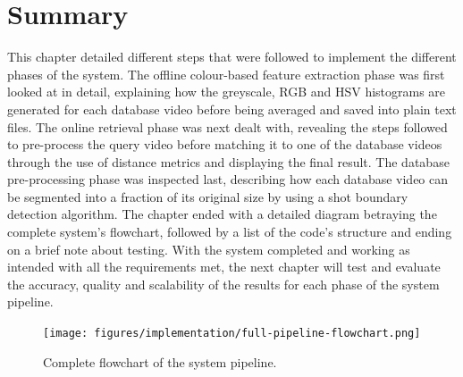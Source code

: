 
\section{Summary}

This chapter detailed different steps that were followed to implement the different phases of the system. The offline colour-based feature extraction phase was first looked at in detail, explaining how the greyscale, RGB and HSV histograms are generated for each database video before being averaged and saved into plain text files. The online retrieval phase was next dealt with, revealing the steps followed to pre-process the query video before matching it to one of the database videos through the use of distance metrics and displaying the final result. The database pre-processing phase was inspected last, describing how each database video can be segmented into a fraction of its original size by using a shot boundary detection algorithm. The chapter ended with a detailed diagram betraying the complete system's flowchart, followed by a list of the code's structure and ending on a brief note about testing. With the system completed and working as intended with all the requirements met, the next chapter will test and evaluate the accuracy, quality and scalability of the results for each phase of the system pipeline. 

\begin{figure}[h] 
\centerline{\texttt{[image: figures/implementation/full-pipeline-flowchart.png]}}
\caption{\label{fig:CBVR-flowchart}Complete flowchart of the system pipeline.}
\end{figure}